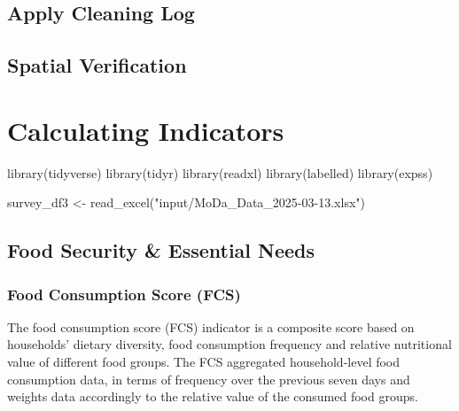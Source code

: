 \documentclass[
  letterpaper,
  DIV=11,
  numbers=noendperiod]{scrreprt}
\newenvironment{Shaded}{\begin{snugshade}}{\end{snugshade}}
\newcommand{\FunctionTok}[1]{\textcolor[rgb]{0.28,0.35,0.67}{#1}}
\newcommand{\NormalTok}[1]{\textcolor[rgb]{0.00,0.23,0.31}{#1}}
\newcommand{\OtherTok}[1]{\textcolor[rgb]{0.00,0.23,0.31}{#1}}
\newcommand{\StringTok}[1]{\textcolor[rgb]{0.13,0.47,0.30}{#1}}
\begin{document}
\hypertarget{apply-cleaning-log}{%
\section{Apply Cleaning Log}\label{apply-cleaning-log}}

\hypertarget{spatial-verification}{%
\section{Spatial Verification}\label{spatial-verification}}


\hypertarget{calculating-indicators}{%
\chapter{Calculating Indicators}\label{calculating-indicators}}

\begin{Shaded}
\begin{Highlighting}[]
\FunctionTok{library}\NormalTok{(tidyverse)}
\FunctionTok{library}\NormalTok{(tidyr)}
\FunctionTok{library}\NormalTok{(readxl)}
\FunctionTok{library}\NormalTok{(labelled)}
\FunctionTok{library}\NormalTok{(expss)}

\NormalTok{survey\_df3 }\OtherTok{\textless{}{-}} \FunctionTok{read\_excel}\NormalTok{(}\StringTok{"input/MoDa\_Data\_2025{-}03{-}13.xlsx"}\NormalTok{)}
\end{Highlighting}
\end{Shaded}

\hypertarget{food-security-essential-needs}{%
\section{Food Security \& Essential
Needs}\label{food-security-essential-needs}}

\hypertarget{food-consumption-score-fcs}{%
\subsection{Food Consumption Score
(FCS)}\label{food-consumption-score-fcs}}

The food consumption score (FCS) indicator is a composite score based on
households' dietary diversity, food consumption frequency and relative
nutritional value of different food groups. The FCS aggregated
household-level food consumption data, in terms of frequency over the
previous seven days and weights data accordingly to the relative value
of the consumed food groups.
\end{document}
